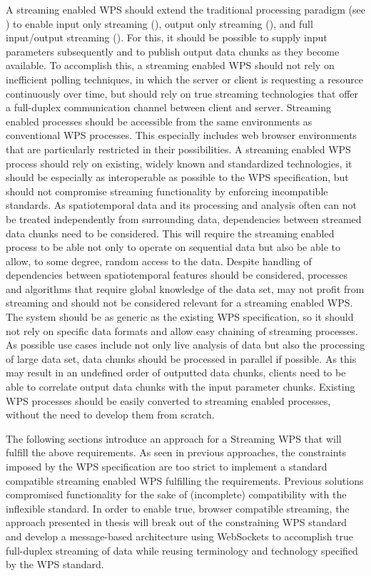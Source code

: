 A streaming enabled \ac{WPS} should extend the traditional processing paradigm (see ) to enable input only streaming (), output only streaming (), and full input/output streaming (). For this, it should be possible to supply input parameters subsequently and to publish output data chunks as they become available. To accomplish this, a streaming enabled \ac{WPS} should not rely on inefficient polling techniques, in which the server or client is requesting a resource continuously over time, but should rely on true streaming technologies that offer a full-duplex communication channel between client and server. Streaming enabled processes should be accessible from the same environments as conventional \ac{WPS} processes. This especially includes web browser environments that are particularly restricted in their possibilities. A streaming enabled \ac{WPS} process should rely on existing, widely known and standardized technologies, it should be especially as interoperable as possible to the \ac{WPS} specification, but should not compromise streaming functionality by enforcing incompatible standards. As spatiotemporal data and its processing and analysis often can not be treated independently from surrounding data, dependencies between streamed data chunks need to be considered. This will require the streaming enabled process to be able not only to operate on sequential data but also be able to allow, to some degree, random access to the data. Despite handling of dependencies between spatiotemporal features should be considered, processes and algorithms that require global knowledge of the data set, may not profit from streaming and should not be considered relevant for a streaming enabled \ac{WPS}. The system should be as generic as the existing \ac{WPS} specification, so it should not rely on specific data formats and allow easy chaining of streaming processes. As possible use cases include not only live analysis of data but also the processing of large data set, data chunks should be processed in parallel if possible. As this may result in an undefined order of outputted data chunks, clients need to be able to correlate output data chunks with the input parameter chunks. Existing \ac{WPS} processes should be easily converted to streaming enabled processes, without the need to develop them from scratch.

The following sections introduce an approach for a Streaming \ac{WPS} that will fulfill the above requirements. As seen in previous approaches, the constraints imposed by the \ac{WPS} specification are too strict to implement a standard compatible streaming enabled WPS fulfilling the requirements. Previous solutions compromised functionality for the sake of (incomplete) compatibility with the inflexible standard. In order to enable true, browser compatible streaming, the approach presented in thesis will break out of the constraining \ac{WPS} standard and develop a message-based architecture using WebSockets to accomplish true full-duplex streaming of data while reusing terminology and technology specified by the \ac{WPS} standard.

